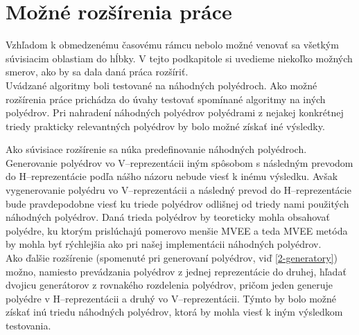 \section{Možné rozšírenia práce}

Vzhľadom k obmedzenému časovému rámcu nebolo možné venovať sa všetkým súvisiacim oblastiam do hĺbky. V tejto podkapitole si uvedieme niekoľko možných smerov, ako by sa dala daná práca rozšíriť.\\

Uvádzané algoritmy boli testované na náhodných polyédroch. Ako možné rozšírenia práce prichádza do úvahy testovať spomínané algoritmy na iných polyédrov. Pri nahradení náhodných polyédrov polyédrami z nejakej konkrétnej triedy prakticky relevantných polyédrov by bolo možné získať iné výsledky. 

Ako súvisiace rozšírenie sa núka predefinovanie náhodných polyédroch. Generovanie polyédrov vo V--reprezentácii iným spôsobom s následným prevodom do H--reprezentácie podľa nášho názoru nebude viesť k inému výsledku. Avšak vygenerovanie polyédru vo V--reprezentácii a následný prevod do H--reprezentácie bude pravdepodobne viesť ku triede polyédrov odlišnej od triedy nami použitých náhodných polyédrov. Daná trieda polyédrov by teoreticky mohla obsahovať polyédre, ku ktorým prislúchajú pomerovo menšie MVEE a teda MVEE metóda by mohla byť rýchlejšia ako pri našej implementácii náhodných polyédrov.\\

Ako ďalšie rozšírenie (spomenuté pri generovaní polyédrov, viď \ref{2-generatory}) možno, namiesto prevádzania polyédrov z jednej reprezentácie do druhej, hľadať dvojicu generátorov z rovnakého rozdelenia polyédrov, pričom jeden generuje polyédre v H--reprezentácii a druhý vo V--reprezentácii. Týmto by bolo možné získať inú triedu náhodných polyédrov, ktorá by mohla viesť k iným výsledkom testovania.







